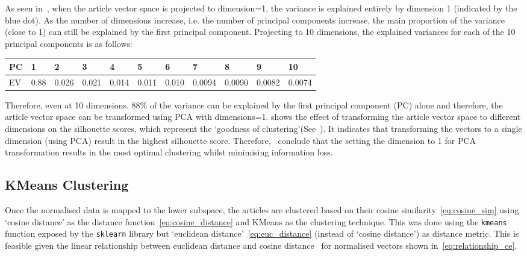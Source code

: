   As seen in~, when the article vector space is projected to dimension=1, the variance is explained entirely by dimension 1 (indicated by the blue dot). As the number of dimensions increase, i.e. the number of principal components increase, the main proportion of the variance (close to 1) can still be explained by the first principal component. Projecting to 10 dimensions, the explained variances for each of the 10 principal components is as follows: 
  \begin{table}[H]
      \centering
  \renewcommand{\arraystretch}{1.1}
  \begin{tabularx}{\textwidth}{|X|X X X X X X X X X X|} 
    \hline
    PC & \textbf{1} & \textbf{2}  & \textbf{3}  & \textbf{4}  & \textbf{5} & \textbf{6} & \textbf{7}  & \textbf{8}  & \textbf{9}  & \textbf{10}\\
    \hline
    EV & 0.88 & 0.026 & 0.021 & 0.014 & 0.011 & 0.010 & 0.0094 & 0.0090 & 0.0082 & 0.0074\\ 
    \hline
    \end{tabularx}
  \end{table}
  
  Therefore, even at 10 dimensions, 88\% of the variance can be explained by the first principal component (PC) alone and therefore, the article vector space can be transformed using PCA with dimensions=1.  shows the effect of transforming the article vector space to different dimensions on the silhouette scores, which represent the `goodness of clustering'(See~). It indicates that transforming the vectors to a single dimension (using PCA) result in the highest silhouette score. Therefore,~ conclude that the setting the dimension to 1 for PCA transformation results in the most optimal clustering whilst minimising information loss.

\subsection{KMeans Clustering}
Once the normalised data is mapped to the lower subspace, the articles are clustered based on their cosine similarity~\cref{eq:cosine_sim} using `cosine distance' as the distance function~\cref{eq:cosine_distance} and KMeans as the clustering technique. This was done using the \texttt{kmeans} function exposed by the \texttt{sklearn} library but `euclidean distance'~\cref{eq:euc_distance} (instead of `cosine distance') as distance metric. This is feasible given the linear relationship between euclidean distance and  cosine distance~\cite{kmeans} for normalised vectors shown in~\cref{eq:relationship_ce}.

